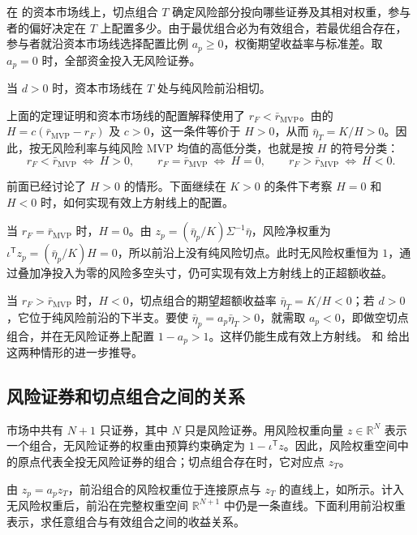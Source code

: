 在 的资本市场线上，切点组合 $T$ 确定风险部分投向哪些证券及其相对权重，参与者的偏好决定在 $T$ 上配置多少。由于最优组合必为有效组合，若最优组合存在，参与者就沿资本市场线选择配置比例 $a_p\ge0$，权衡期望收益率与标准差。取 $a_p=0$ 时，全部资金投入无风险证券。


当 $d>0$ 时，资本市场线在 $T$ 处与纯风险前沿相切。



上面的定理证明和资本市场线的配置解释使用了 $r_F<\bar r_{\mathrm{MVP}}$。由的 $H=c(\bar r_{\mathrm{MVP}}-r_F)$ 及 $c>0$，这一条件等价于 $H>0$，从而 $\bar\eta_T=K/H>0$。因此，按无风险利率与纯风险 MVP 均值的高低分类，也就是按 $H$ 的符号分类：
\[
 r_F<\bar r_{\mathrm{MVP}}\ \Longleftrightarrow\ H>0,\qquad
 r_F=\bar r_{\mathrm{MVP}}\ \Longleftrightarrow\ H=0,\qquad
 r_F>\bar r_{\mathrm{MVP}}\ \Longleftrightarrow\ H<0.
\]

前面已经讨论了 $H>0$ 的情形。下面继续在 $K>0$ 的条件下考察 $H=0$ 和 $H<0$ 时，如何实现有效上方射线上的配置。

当 $r_F=\bar r_{\mathrm{MVP}}$ 时，$H=0$。由 $z_p=(\bar\eta_p/K)\Sigma^{-1}\bar\eta$，风险净权重为 $\iota^{\mathsf T}z_p=(\bar\eta_p/K)H=0$，所以前沿上没有纯风险切点。此时无风险权重恒为 $1$，通过叠加净投入为零的风险多空头寸，仍可实现有效上方射线上的正超额收益。

当 $r_F>\bar r_{\mathrm{MVP}}$ 时，$H<0$，切点组合的期望超额收益率 $\bar\eta_T=K/H<0$；若 $d>0$，它位于纯风险前沿的下半支。要使 $\bar\eta_p=a_p\bar\eta_T>0$，就需取 $a_p<0$，即做空切点组合，并在无风险证券上配置 $1-a_p>1$。这样仍能生成有效上方射线。 和 给出这两种情形的进一步推导。

\subsection{风险证券和切点组合之间的关系}
市场中共有 $N+1$ 只证券，其中 $N$ 只是风险证券。用风险权重向量 $z\in\mathbb R^N$ 表示一个组合，无风险证券的权重由预算约束确定为 $1-\iota^{\mathsf T}z$。因此，风险权重空间中的原点代表全投无风险证券的组合；切点组合存在时，它对应点 $z_T$。

由 $z_p=a_pz_T$，前沿组合的风险权重位于连接原点与 $z_T$ 的直线上，如所示。计入无风险权重后，前沿在完整权重空间 $\mathbb R^{N+1}$ 中仍是一条直线。下面利用前沿权重表示，求任意组合与有效组合之间的收益关系。

